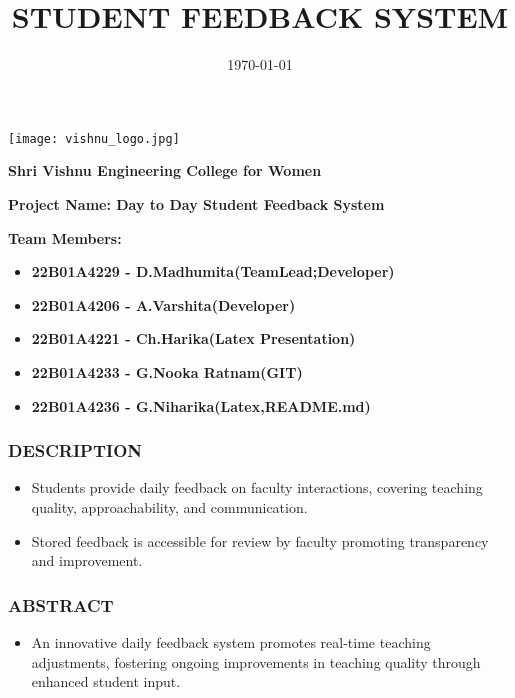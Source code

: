 \documentclass{beamer}
\title{STUDENT FEEDBACK SYSTEM}
\institute{SVECW}
\date{\today}
\begin{document}
\begin{frame}
  \begin{center}
    \texttt{[image: vishnu\_logo.jpg]}
  \end{center}

  \begin{center}
    \textbf{\large \colorbox{yellow!20}{Shri Vishnu Engineering College for Women}}
  \end{center}

  \begin{center}
    \textbf{\large\colorbox{purple!20}{Project Name: Day to Day Student Feedback System}}
  \end{center}

  \begin{flushleft}
    \textbf{\large\colorbox{blue!20}{Team Members:}}
  \end{flushleft}

  \begin{itemize}
          \item{\small\textbf {22B01A4229 - D.Madhumita(TeamLead;Developer)}}
          \item{\small\textbf {22B01A4206 - A.Varshita(Developer)}}
          \item{\small\textbf {22B01A4221 - Ch.Harika(Latex Presentation)}}
          \item{\small\textbf {22B01A4233 - G.Nooka Ratnam(GIT)}}
          \item{\small\textbf {22B01A4236 - G.Niharika(Latex,README.md)}}
  \end{itemize}
\end{frame}

\begin{frame}
  \frametitle{DESCRIPTION}

  \begin{itemize}
    \item Students provide daily feedback on faculty interactions, covering teaching quality, approachability, and communication.
    \item Stored feedback is accessible for review by faculty promoting transparency and improvement.
  \end{itemize}
\end{frame}

\begin{frame}
  \frametitle{ABSTRACT}

  \begin{itemize}
    \item An innovative daily feedback system promotes real-time teaching adjustments, fostering ongoing improvements in teaching quality through enhanced student input.
  \end{itemize}
\end{frame}
\end{document}
